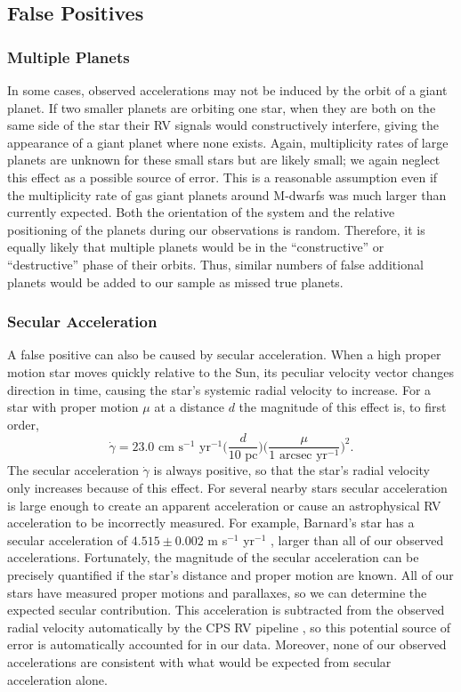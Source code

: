 \subsection{False Positives}
\label{FP}
\subsubsection{Multiple Planets}
In some cases, observed accelerations may not be induced by the orbit of a giant planet. If two smaller planets are orbiting one star, when they are both on the same side of the star their RV signals would constructively interfere, giving the appearance of a giant planet where none exists. Again, multiplicity rates of large planets are unknown for these small stars but are likely small; we again neglect this effect as a possible source of error. This is a reasonable assumption even if the multiplicity rate of gas giant planets around M-dwarfs was much larger than currently expected. Both the orientation of the system and the relative positioning of the planets during our observations is random. Therefore, it is equally likely that multiple planets would be in the ``constructive'' or ``destructive'' phase of their orbits. Thus, similar numbers of false additional planets would be added to our sample as missed true planets. 

\subsubsection{Secular Acceleration}
A false positive can also be caused by secular acceleration. When a high proper motion star moves quickly relative to the Sun, its peculiar velocity vector changes direction in time, causing the star's systemic radial velocity to increase. For a star with proper motion $\mu$ at a distance $d$ the magnitude of this effect is, to first order,
\begin{equation}
\dot\gamma = 23.0 \textrm{ cm s}^{-1} \textrm{ yr}^{-1} \bigg(\frac{d}{10\textrm{ pc}}\bigg)\bigg(\frac{\mu}{1 \textrm{ arcsec yr}^{-1}}\bigg)^2.
\end{equation}
The secular acceleration $\dot\gamma$ is always positive, so that the star's radial velocity only increases because of this effect. For several nearby stars secular acceleration is large enough to create an apparent acceleration or cause an astrophysical RV acceleration to be incorrectly measured. For example, Barnard's star has a secular acceleration of $4.515 \pm 0.002$ m s$^{-1}$ yr$^{-1}$ \citep{Choi13}, larger than all of our observed accelerations. Fortunately, the magnitude of the secular acceleration can be precisely quantified if the star's distance and proper motion are known. All of our stars have measured proper motions and parallaxes, so we can determine the expected secular contribution. This acceleration is subtracted from the observed radial velocity automatically by the CPS RV pipeline \citep{Howard10}, so this potential source of error is automatically accounted for in our data. Moreover, none of our observed accelerations are consistent with what would be expected from secular acceleration alone. 

